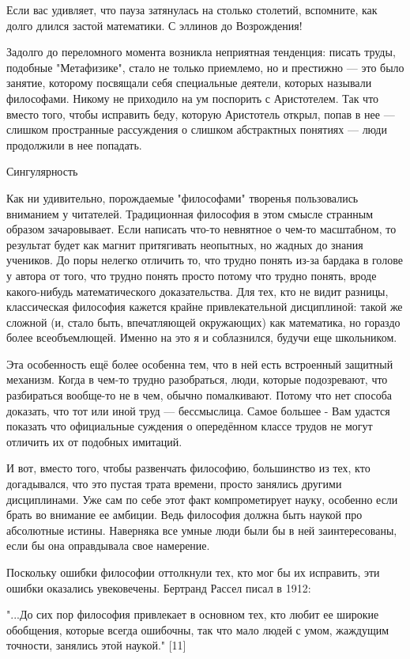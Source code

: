 \documentclass[ebook,12pt,oneside,openany]{memoir}
\begin{document}
Если вас удивляет, что пауза затянулась на столько столетий,
вспомните, как долго длился застой математики. С эллинов до
Возрождения!

Задолго до переломного момента возникла неприятная тенденция: писать
труды, подобные "Метафизике", стало не только приемлемо, но и
престижно — это было занятие, которому посвящали себя специальные
деятели, которых называли философами. Никому не приходило на ум
поспорить с Аристотелем. Так что вместо того, чтобы исправить беду,
которую Аристотель открыл, попав в нее — слишком пространные
рассуждения о слишком абстрактных понятиях — люди продолжили в нее
попадать.

Сингулярность

Как ни удивительно, порождаемые "философами" творенья пользовались
вниманием у читателей. Традиционная философия в этом смысле странным
образом зачаровывает. Если написать что-то невнятное о чем-то
масштабном, то результат будет как магнит притягивать неопытных, но
жадных до знания учеников. До поры нелегко отличить то, что трудно
понять из-за бардака в голове у автора от того, что трудно понять
просто потому что трудно понять, вроде какого-нибудь математического
доказательства. Для тех, кто не видит разницы, классическая философия
кажется крайне привлекательной дисциплиной: такой же сложной (и, стало
быть, впечатляющей окружающих) как математика, но гораздо более
всеобъемлющей. Именно на это я и соблазнился, будучи еще школьником.

Эта особенность ещё более особенна тем, что в ней есть встроенный
защитный механизм. Когда в чем-то трудно разобраться, люди, которые
подозревают, что разбираться вообще-то не в чем, обычно помалкивают.
Потому что нет способа доказать, что тот или иной труд — бессмыслица.
Самое большее - Вам удастся показать что официальные суждения о
опередённом классе трудов не могут отличить их от подобных имитаций.

И вот, вместо того, чтобы развенчать философию, большинство из тех,
кто догадывался, что это пустая трата времени, просто занялись другими
дисциплинами. Уже сам по себе этот факт компрометирует науку, особенно
если брать во внимание ее амбиции. Ведь философия должна быть наукой
про абсолютные истины. Наверняка все умные люди были бы в ней
заинтересованы, если бы она оправдывала свое намерение.

Поскольку ошибки философии оттолкнули тех, кто мог бы их исправить,
эти ошибки оказались увековечены. Бертранд Рассел писал в 1912:

"...До сих пор философия привлекает в основном тех, кто любит ее
широкие обобщения, которые всегда ошибочны, так что мало людей с умом,
жаждущим точности, занялись этой наукой." [11]
\end{document}
